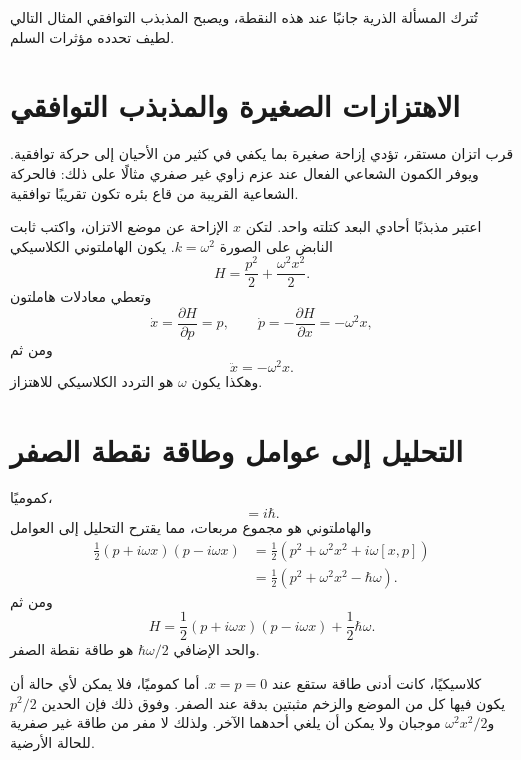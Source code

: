 تُترك المسألة الذرية جانبًا عند هذه النقطة، ويصبح المذبذب التوافقي المثال التالي لطيف تحدده مؤثرات السلم.

\section{الاهتزازات الصغيرة والمذبذب التوافقي}

قرب اتزان مستقر، تؤدي إزاحة صغيرة بما يكفي في كثير من الأحيان إلى حركة توافقية. ويوفر الكمون الشعاعي الفعال عند عزم زاوي غير صفري مثالًا على ذلك: فالحركة الشعاعية القريبة من قاع بئره تكون تقريبًا توافقية.

اعتبر مذبذبًا أحادي البعد كتلته واحد. لتكن \(x\) الإزاحة عن موضع الاتزان، واكتب ثابت النابض على الصورة \(k=\omega^2\). يكون الهاملتوني الكلاسيكي
\begin{equation}
H=\frac{p^2}{2}+\frac{\omega^2x^2}{2}.
\end{equation}
وتعطي معادلات هاملتون
\begin{equation}
\dot{x}=\frac{\partial H}{\partial p}=p,
\qquad
\dot{p}=-\frac{\partial H}{\partial x}=-\omega^2x,
\end{equation}
ومن ثم
\begin{equation}
\ddot{x}=-\omega^2x.
\end{equation}
وهكذا يكون \(\omega\) هو التردد الكلاسيكي للاهتزاز.

\section{التحليل إلى عوامل وطاقة نقطة الصفر}

كموميًا،
\begin{equation}
[x,p]=i\hbar.
\end{equation}
والهاملتوني هو مجموع مربعات، مما يقترح التحليل إلى العوامل
\begin{align}
\frac{1}{2}(p+i\omega x)(p-i\omega x)
&=\frac{1}{2}\left(p^2+\omega^2x^2+i\omega[x,p]\right) \\
&=\frac{1}{2}\left(p^2+\omega^2x^2-\hbar\omega\right).
\end{align}
ومن ثم
\begin{equation}
H=\frac{1}{2}(p+i\omega x)(p-i\omega x)
+\frac{1}{2}\hbar\omega.
\end{equation}
والحد الإضافي \(\hbar\omega/2\) هو طاقة نقطة الصفر.

كلاسيكيًا، كانت أدنى طاقة ستقع عند \(x=p=0\). أما كموميًا، فلا يمكن لأي حالة أن يكون فيها كل من الموضع والزخم مثبتين بدقة عند الصفر. وفوق ذلك فإن الحدين \(p^2/2\) و\(\omega^2x^2/2\) موجبان ولا يمكن أن يلغي أحدهما الآخر. ولذلك لا مفر من طاقة غير صفرية للحالة الأرضية.

